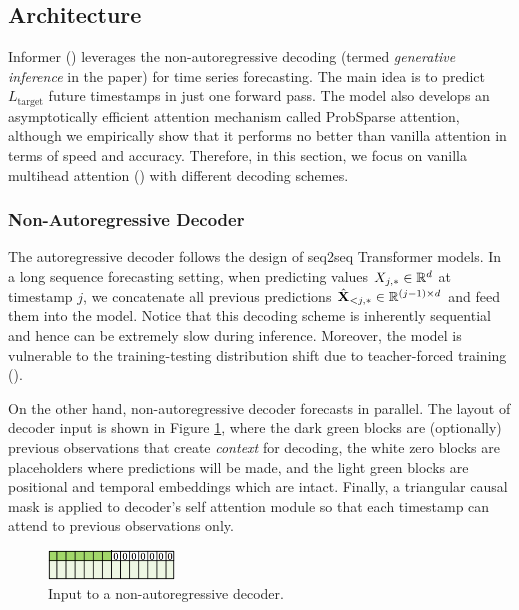 \subsection{Architecture}
Informer (\citet{https://doi.org/10.48550/arxiv.2012.07436}) leverages the non-autoregressive decoding (termed \textit{generative inference} in the paper) for time series forecasting. 
The main idea is to predict $L_\text{target}$ future timestamps in just one forward pass. 
The model also develops an asymptotically efficient attention mechanism called ProbSparse attention, although we empirically show that it performs no better than vanilla attention in terms of speed and accuracy. 
Therefore, in this section, we focus on vanilla multihead attention (\citet{https://doi.org/10.48550/arxiv.1706.03762}) with different decoding schemes. 

\subsubsection{Non-Autoregressive Decoder}
The autoregressive decoder follows the design of seq2seq Transformer models. 
In a long sequence forecasting setting, when predicting values $X_{j, *} \in \mathbb{R}^{d}$ at timestamp $j$, we concatenate all previous predictions $\hat{\mathbf{X}}_{<j, *} \in \mathbb{R}^{(j - 1) \times d}$ and feed them into the model.  
Notice that this decoding scheme is inherently sequential and hence can be extremely slow during inference. 
Moreover, the model is vulnerable to the training-testing distribution shift due to teacher-forced training (\citet{6795228}). 

On the other hand, non-autoregressive decoder forecasts in parallel. 
The layout of decoder input is shown in Figure \ref{fig:nonauto_input}, where the dark green blocks are (optionally) previous observations that create \textit{context} for decoding, 
the white zero blocks are placeholders where predictions will be made, 
and the light green blocks are positional and temporal embeddings which are intact. 
Finally, a triangular causal mask is applied to decoder's self attention module so that each timestamp can attend to previous observations only. 

\begin{figure}
    \centering
    \includegraphics[width=0.3\textwidth]{img/nonauto_input.png}
    \caption{Input to a non-autoregressive decoder.}
    \label{fig:nonauto_input}
\end{figure}

